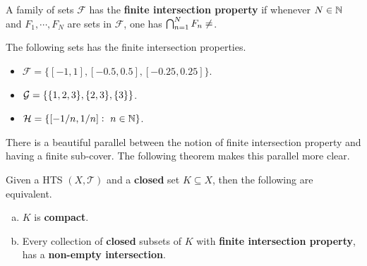 \begin{definition}
	A family of sets $\mathcal{F}$ has the \textbf{finite intersection property} if whenever $N \in \mathbb{N}$ and $F_1, \cdots, F_N$ are sets in $\mathcal{F}$, one has $\bigcap_{n=1}^N F_n \neq \empty$.
\end{definition}

\begin{example}
	The following sets has the finite intersection properties.
	\begin{itemize}
		\item $\mathcal{F} = \{ [-1,1],[-0.5,0.5],[-0.25,0.25]\}$.
		\item $\mathcal{G} = \{ \{1,2,3\}, \{2,3\}, \{3\} \}$.
		\item $\mathcal{H} = \{ [-1/n,1/n]:\ n\in\mathbb{N} \}$.
	\end{itemize}
\end{example}

There is a beautiful parallel between the notion of finite intersection property and having a finite sub-cover. The following theorem makes this parallel more clear.

\begin{theorem}
	\label{thm:ClosedCharacterCompact}
	Given a HTS $(X,\mathcal{T})$ and a \textbf{closed} set $K \subseteq X$, then the following are equivalent.
	\begin{enumerate}[(a)]
		\item $K$ is \textbf{compact}.
		\item Every collection of \textbf{closed} subsets of $K$ with \textbf{finite intersection property}, has a \textbf{non-empty intersection}.
	\end{enumerate}
\end{theorem}

